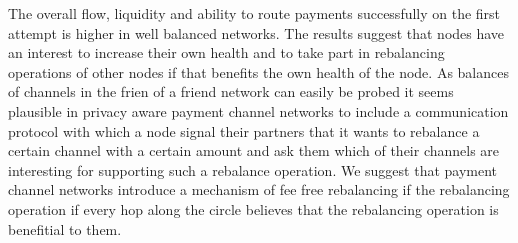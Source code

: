 \documentclass[a4paper]{paper}
\begin{document}
The overall flow, liquidity and ability to route payments successfully on the first attempt is higher in well balanced networks. 
The results suggest that nodes have an interest to increase their own health and to take part in rebalancing operations of other nodes if that benefits the own health of the node.
As balances of channels in the frien of a friend network can easily be probed it seems plausible in privacy aware payment channel networks to include a communication protocol with which a node signal their partners that it wants to rebalance a certain channel with a certain amount and ask them which of their channels are interesting for supporting such a rebalance operation.
We suggest that payment channel networks introduce a mechanism of fee free rebalancing if the rebalancing operation if every hop along the circle believes that the rebalancing operation is benefitial to them. 




\end{document}
